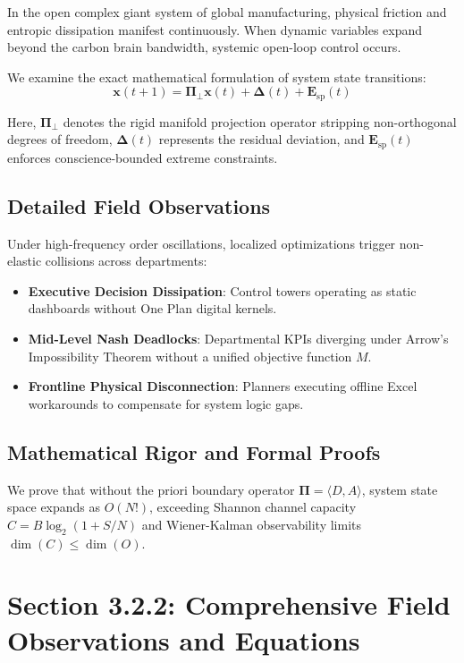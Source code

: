 \documentclass[12pt,a4paper,oneside]{book}
\begin{document}
In the open complex giant system of global manufacturing, physical friction and entropic dissipation manifest continuously. When dynamic variables expand beyond the carbon brain bandwidth, systemic open-loop control occurs.

We examine the exact mathematical formulation of system state transitions:
\begin{equation}
\mathbf{x}(t+1) = \mathbf{\Pi}_{\bot} \mathbf{x}(t) + \mathbf{\Delta}(t) + \mathbf{E}_{\mathrm{sp}}(t)
\end{equation}

Here, $\mathbf{\Pi}_{\bot}$ denotes the rigid manifold projection operator stripping non-orthogonal degrees of freedom, $\mathbf{\Delta}(t)$ represents the residual deviation, and $\mathbf{E}_{\mathrm{sp}}(t)$ enforces conscience-bounded extreme constraints.

\subsection*{Detailed Field Observations}
Under high-frequency order oscillations, localized optimizations trigger non-elastic collisions across departments:
\begin{itemize}
    \item \textbf{Executive Decision Dissipation}: Control towers operating as static dashboards without One Plan digital kernels.
    \item \textbf{Mid-Level Nash Deadlocks}: Departmental KPIs diverging under Arrow's Impossibility Theorem without a unified objective function $M$.
    \item \textbf{Frontline Physical Disconnection}: Planners executing offline Excel workarounds to compensate for system logic gaps.
\end{itemize}

\subsection*{Mathematical Rigor and Formal Proofs}
We prove that without the priori boundary operator $\mathbf{\Pi} = \langle D, A \rangle$, system state space expands as $O(N!)$, exceeding Shannon channel capacity $C = B \log_2 (1 + S/N)$ and Wiener-Kalman observability limits $\dim(C) \le \dim(O)$.
\clearpage
\section{Section 3.2.2: Comprehensive Field Observations and Equations}
\end{document}
